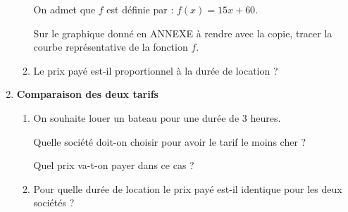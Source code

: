 \begin{act}
\begin{enumerate}
\begin{enumerate}
On admet que $f$ est définie par : $f(x) = 15x + 60$.

Sur le graphique donné en ANNEXE à rendre avec la copie, tracer la courbe représentative de la fonction $f$.
		\item Le prix payé est-il proportionnel à la durée de location ?
	\end{enumerate}
\item \textbf{Comparaison des deux tarifs}
	\begin{enumerate}
		\item On souhaite louer un bateau pour une durée de 3 heures.

Quelle société doit-on choisir pour avoir le tarif le moins cher ?

Quel prix va-t-on payer dans ce cas ?
		\item Pour quelle durée de location le prix payé est-il identique pour les deux sociétés ?
	\end{enumerate}
\end{enumerate}
\end{act}


